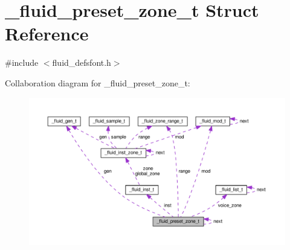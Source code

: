 \hypertarget{struct__fluid__preset__zone__t}{}\section{\+\_\+fluid\+\_\+preset\+\_\+zone\+\_\+t Struct Reference}
\label{struct__fluid__preset__zone__t}


{\ttfamily \#include $<$fluid\+\_\+defsfont.\+h$>$}



Collaboration diagram for \+\_\+fluid\+\_\+preset\+\_\+zone\+\_\+t\+:
\nopagebreak
\begin{figure}[H]
\begin{center}
\leavevmode
\includegraphics[width=350pt]{struct__fluid__preset__zone__t__coll__graph}
\end{center}
\end{figure}
